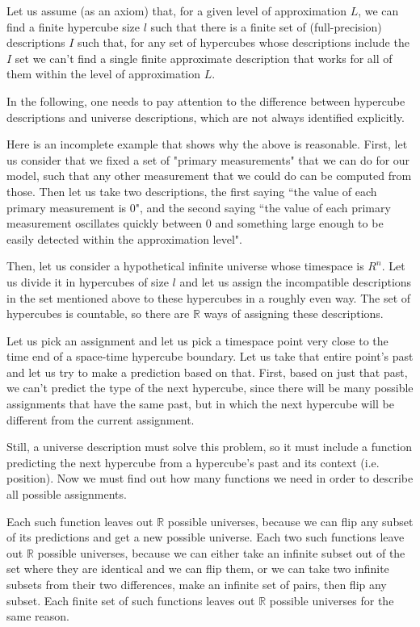 \documentclass[a4paper
,draft
]{article}
\def\reale{\mathbb{R}}
\newcommand{\ghilimele}[1]{``#1"}
\begin{document}
Let us assume (as an axiom) that, for a given level of approximation $L$, we can
find a finite hypercube size $l$ such that there is a finite set of
(full-precision)
descriptions $I$ such that,
for any set of hypercubes whose descriptions include the $I$ set we can't
find a single finite approximate description that works for all of them
within the level of approximation $L$.

In the following, one needs to pay attention to the difference between
hypercube descriptions and universe descriptions, which are not always
identified explicitly.

Here is an incomplete example that shows why the above is reasonable.
First, let us consider that we fixed a set of "primary measurements" that we
can do for our model, such that any other measurement that we could do can be
computed from those.
Then let us take two descriptions, the first saying
\ghilimele{the value of each primary measurement is $0$},
and the second saying
\ghilimele{the value of each primary measurement oscillates quickly
  between $0$ and something large enough to be easily detected within
  the approximation level}.

Then, let us consider a hypothetical infinite universe whose timespace is $R^n$.
Let us divide it in hypercubes of size $l$ and let us assign the incompatible
descriptions in the set mentioned above to these hypercubes in a roughly even
way.
The set of hypercubes is countable, so there are $\reale$ ways of
assigning these descriptions.

Let us pick an assignment and let us pick a timespace point very close to the
time end of a space-time hypercube boundary.
Let us take that entire point's past and let us try to make a prediction based
on that.
First, based on just that past, we can't predict the type of the next hypercube,
since there will be many possible assignments that have the same past, but in
which the next hypercube will be different from the current assignment.

Still, a universe description must solve this problem, so it must include
a function predicting the next hypercube from a hypercube's past
and its context (i.e. position). Now we must find out how many functions
we need in order to describe all possible assignments.

Each such function leaves out $\reale$ possible universes, because we
can flip any subset of its predictions and get a new possible universe.
Each two such functions leave out $\reale$ possible universes,
because we can either take an infinite subset out of the set where they are
identical and we can flip them, or we can take two infinite subsets from
their two differences, make an infinite set of pairs, then flip any subset.
Each finite set of such functions leaves out $\reale$ possible universes
for the same reason.
\end{document}

